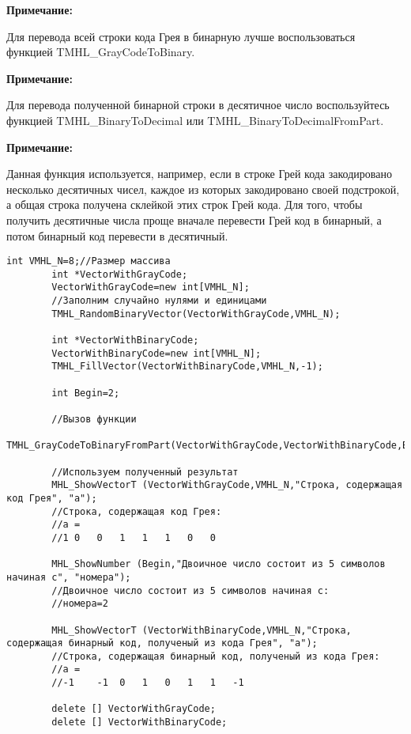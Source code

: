 \documentclass[a4paper,12pt]{article}
\begin{document}
 \textbf{Примечание:}
 
 Для перевода всей строки кода Грея в бинарную лучше воспользоваться функцией TMHL\_GrayCodeToBinary.

 \textbf{Примечание:}

 Для перевода полученной бинарной строки в десятичное число воспользуйтесь функцией TMHL\_BinaryToDecimal или TMHL\_BinaryToDecimalFromPart.

 \textbf{Примечание:}
 
 Данная функция используется, например, если в строке Грей кода закодировано несколько десятичных чисел, каждое из которых закодировано своей подстрокой, а общая строка получена склейкой этих строк Грей кода. Для того, чтобы получить десятичные числа проще вначале перевести Грей код в бинарный, а потом бинарный код перевести в десятичный.


\begin{lstlisting}[label=code_use_TMHL_GrayCodeToBinaryFromPart,caption=Пример использования]
        int VMHL_N=8;//Размер массива
        int *VectorWithGrayCode;
        VectorWithGrayCode=new int[VMHL_N];
        //Заполним случайно нулями и единицами
        TMHL_RandomBinaryVector(VectorWithGrayCode,VMHL_N);

        int *VectorWithBinaryCode;
        VectorWithBinaryCode=new int[VMHL_N];
        TMHL_FillVector(VectorWithBinaryCode,VMHL_N,-1);

        int Begin=2;

        //Вызов функции
        TMHL_GrayCodeToBinaryFromPart(VectorWithGrayCode,VectorWithBinaryCode,Begin,5);

        //Используем полученный результат
        MHL_ShowVectorT (VectorWithGrayCode,VMHL_N,"Строка, содержащая код Грея", "a");
        //Строка, содержащая код Грея:
        //a =	
        //1	0	0	1	1	1	0	0

        MHL_ShowNumber (Begin,"Двоичное число состоит из 5 символов начиная с", "номера");
        //Двоичное число состоит из 5 символов начиная с:
        //номера=2
        
        MHL_ShowVectorT (VectorWithBinaryCode,VMHL_N,"Строка, содержащая бинарный код, полученый из кода Грея", "a");
        //Строка, содержащая бинарный код, полученый из кода Грея:
        //a =	
        //-1	-1	0	1	0	1	1	-1

        delete [] VectorWithGrayCode;
        delete [] VectorWithBinaryCode;
\end{lstlisting}
\end{document}

